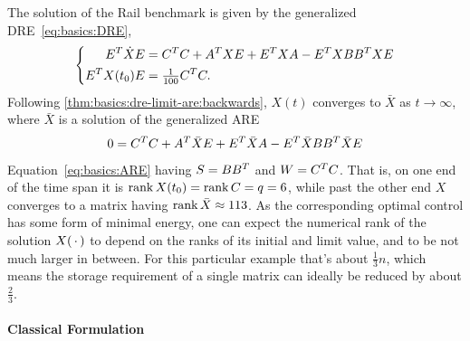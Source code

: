 \begin{example}
\label{thm:lowrank:rail}
  The solution of the Rail benchmark \cite{morwiki_steel} is given by the generalized \ac{DRE}~\eqref{eq:basics:DRE},
  \begin{equation*}
  \left\{
  \begin{aligned}
    E^T \dot X E &= C^T C + A^T X E + E^T X A - E^T X BB^T X E \\
    E^T X(t_0) E &= \tfrac{1}{100} C^T C
    .
  \end{aligned}
  \right.
  \end{equation*}
  Following \autoref{thm:basics:dre-limit-are:backwards},
  $X(t)$ converges to $\bar X$ as $t\to\infty$,
  where $\bar X$ is a solution of the generalized \ac{ARE}
  \begin{equation*}
    0 = C^T C + A^T \bar X E + E^T \bar X A - E^T \bar X BB^T \bar X E
  \end{equation*}
  \cf Equation~\eqref{eq:basics:ARE} having $S = BB^T$ and $W = C^T C$.
  That is, on one end of the time span it is $\operatorname{rank} X(t_0) = \operatorname{rank} C = q = 6$,
  while past the other end $X$ converges to a matrix having $\operatorname{rank} \bar X \approx 113$.
  As the corresponding optimal control has some form of minimal energy,
  one can expect the numerical rank of the solution $X(\optional{})$ to depend on the ranks of its initial and limit value,
  and to be not much larger in between.
  For this particular example that's about $\frac{1}{3}n$,
  which means the storage requirement of a single matrix can ideally be reduced by about $\frac{2}{3}$.
\end{example}

%
%
%
%
%
%

\paragraph{Classical Formulation}

